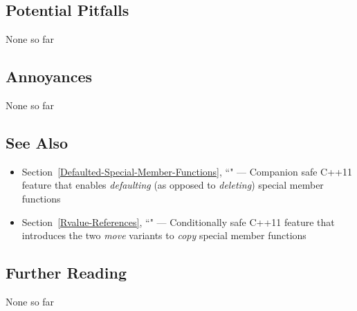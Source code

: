 \subsection[Potential Pitfalls]{Potential Pitfalls}\label{potential-pitfalls}

None so far

\subsection[Annoyances]{Annoyances}\label{annoyances}

None so far

\subsection[See Also]{See Also}\label{see-also}

\begin{itemize}
\item{Section~\ref{Defaulted-Special-Member-Functions}, ``" — Companion safe C++11 feature that enables \emph{defaulting} (as opposed to \emph{deleting}) special member functions}
\item{Section~\ref{Rvalue-References}, ``" — Conditionally safe C++11 feature that introduces the two \emph{move} variants to \emph{copy} special member functions}
\end{itemize}

\subsection[Further Reading]{Further Reading}\label{further-reading}

None so far


